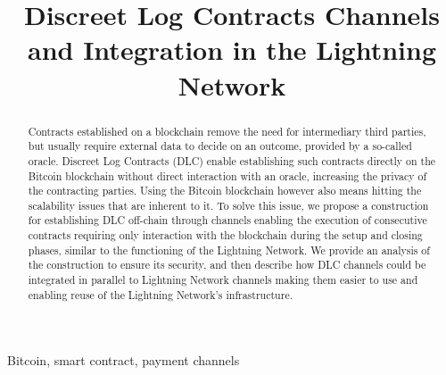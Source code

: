 \documentclass[compsoc,conference,a4paper,10pt,times]{IEEEtran}
\begin{document}
\title{Discreet Log Contracts Channels and Integration in the Lightning Network}

\author{
\and
{}
\and
{}
}

\maketitle

\begin{abstract}
Contracts established on a blockchain remove the need for intermediary third parties, but usually require external data to decide on an outcome, provided by a so-called oracle.
Discreet Log Contracts (DLC) enable establishing such contracts directly on the Bitcoin blockchain without direct interaction with an oracle, increasing the privacy of the contracting parties.
Using the Bitcoin blockchain however also means hitting the scalability issues that are inherent to it.
To solve this issue, we propose a construction for establishing DLC off-chain through channels enabling the execution of consecutive contracts requiring only interaction with the blockchain during the setup and closing phases, similar to the functioning of the Lightning Network.
We provide an analysis of the construction to ensure its security, and then describe how DLC channels could be integrated in parallel to Lightning Network channels making them easier to use and enabling reuse of the Lightning Network's infrastructure.
\end{abstract}

\begin{IEEEkeywords}
Bitcoin, smart contract, payment channels
\end{IEEEkeywords}








{}


\appendices


\end{document}
